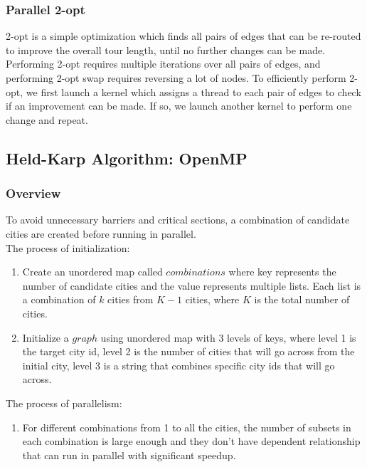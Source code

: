 \documentclass{article}
\begin{document}
\subsubsection{Parallel 2-opt}
    2-opt is a simple optimization which finds all pairs of edges that can be re-routed to improve the overall tour length, until no further changes can be made. Performing 2-opt requires multiple iterations over all pairs of edges, and performing 2-opt swap requires reversing a lot of nodes. To efficiently perform 2-opt, we first launch a kernel which assigns a thread to each pair of edges to check if an improvement can be made. If so, we launch another kernel to perform one change and repeat. 
    
\subsection{Held-Karp Algorithm: OpenMP}
\subsubsection{Overview}
    To avoid unnecessary barriers and critical sections, a combination of candidate cities are created before running in parallel.\\
    The process of initialization:
    \begin{enumerate}
        \item Create an unordered map called $combinations$ where key represents the number of candidate cities and the value represents multiple lists. Each list is a combination of $k$ cities from $K-1$ cities, where $K$ is the total number of cities.
        \item Initialize a $graph$ using unordered map with 3 levels of keys, where level 1 is the target city id, level 2 is the number of cities that will go across from the initial city, level 3 is a string that combines specific city ids that will go across.
    \end{enumerate}
    The process of parallelism:
    \begin{enumerate}
        \item For different combinations from 1 to all the cities, the number of subsets in each combination is large enough and they don't have dependent relationship that can run in parallel with significant speedup.
    \end{enumerate}
\end{document}
